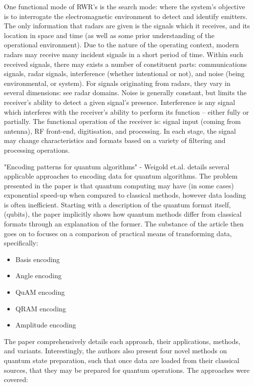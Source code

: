 One functional mode of RWR's is the search mode: where the system’s objective is to interrogate the electromagnetic environment to detect and identify emitters. The only information that radars are given is the signals which it receives, and its location in space and time (as well as some prior understanding of the operational environment). Due to the nature of the operating context, modern radars may receive many incident signals in a short period of time. Within such received signals, there may exists a number of constituent parts: communications signals, radar signals, interference (whether intentional or not), and noise (being environmental, or system). For signals originating from radars, they vary in several dimensions: see radar domains. Noise is generally constant, but limits the receiver’s ability to detect a given signal’s presence. Interference is any signal which interferes with the receiver’s ability to perform its function – either fully or partially. The functional operation of the receiver is: signal input (coming from antenna), RF front-end, digitisation, and processing. In each stage, the signal may change characteristics and formats based on a variety of filtering and processing operations. \cite{stimson_introduction_1998}

"Encoding patterns for quantum algorithms" - Weigold et.al. \cite{weigold_encoding_2021} details several applicable approaches to encoding data for quantum algorithms. The problem presented in the paper is that quantum computing may have (in some cases) exponential speed-up when compared to classical methods, however data loading is often inefficient. Starting with a description of the quantum format itself, (qubits), the paper implicitly shows how quantum methods differ from classical formats through an explanation of the former. The substance of the article then goes on to focuses on a comparison of practical means of transforming data, specifically:
\begin{itemize}
    \item Basis encoding
    \item Angle encoding
    \item QuAM encoding 
    \item QRAM encoding
    \item Amplitude encoding
\end{itemize}

The paper comprehensively details each approach, their applications, methods, and variants. Interestingly, the authors also present four novel methods on quantum state preparation, such that once data are loaded from their classical sources, that they may be prepared for quantum operations. The approaches were covered:

